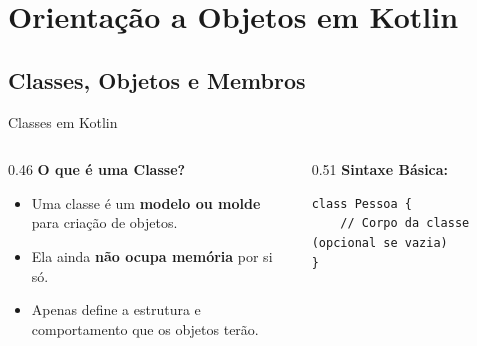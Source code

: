 \documentclass[aspectratio=169]{beamer}
\begin{document}
\section{Orientação a Objetos em Kotlin}

\subsection{Classes, Objetos e Membros}

\begin{frame}[fragile]{Classes em Kotlin}
  \begin{columns}[T]
    \begin{column}{0.46\textwidth}
      \textbf{O que é uma Classe?}
      \vspace{0.3em}
      \begin{itemize}\small
        \item Uma classe é um \textbf{modelo ou molde} para criação de objetos.
        \item Ela ainda \textbf{não ocupa memória} por si só.
        \item Apenas define a estrutura e comportamento que os objetos terão.
      \end{itemize}
    \end{column}
    \begin{column}{0.51\textwidth}
      \textbf{Sintaxe Básica:}
      \vspace{0.2em}
\begin{lstlisting}[style=KotlinStyle]
class Pessoa {
    // Corpo da classe (opcional se vazia)
}
\end{lstlisting}
    \end{column}
  \end{columns}
\end{frame}
\end{document}
